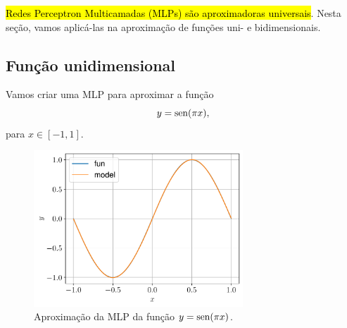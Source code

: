 \hl{Redes Perceptron Multicamadas (MLPs) são aproximadoras universais}. Nesta seção, vamos aplicá-las na aproximação de funções uni- e bidimensionais.

\subsection{Função unidimensional}\label{mlp_apfun_1d}

Vamos criar uma MLP para aproximar a função
\begin{equation}
  y = \operatorname{sen}(\pi x),
\end{equation}
para $x\in [-1,1]$.

\begin{figure}[H]
  \centering
  \includegraphics[width=0.7\textwidth]{cap_mlp/dados/fig_mlp_apfun_1d/fig}
  \caption{Aproximação da MLP da função $y = \operatorname{sen}(\pi x)$.}
  \label{fig:mlp_mlp_apfun_1d}
\end{figure}

